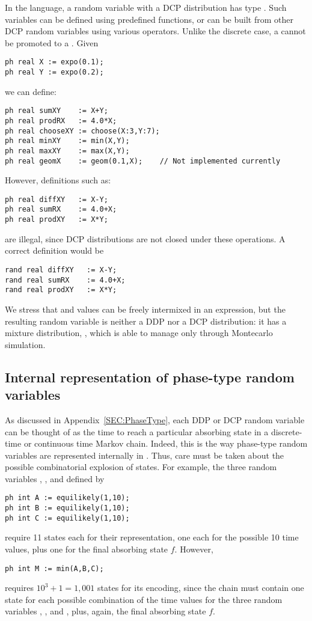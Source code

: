 In the {\smart} language, a random variable with a DCP distribution
has type .
Such variables can be defined using predefined functions, or can be built
from other DCP random variables using various operators.
Unlike the discrete case, a  cannot be promoted to a .
Given
\begin{lstlisting}
ph real X := expo(0.1);
ph real Y := expo(0.2);
\end{lstlisting} 
we can define:
\begin{lstlisting}
ph real sumXY    := X+Y;
ph real prodRX   := 4.0*X;
ph real chooseXY := choose(X:3,Y:7);
ph real minXY    := min(X,Y);
ph real maxXY    := max(X,Y);
ph real geomX    := geom(0.1,X);    // Not implemented currently
\end{lstlisting}
However, definitions such as:
\begin{lstlisting}
ph real diffXY   := X-Y;
ph real sumRX    := 4.0+X;
ph real prodXY   := X*Y;
\end{lstlisting}
are illegal, since DCP distributions are not closed under these
operations.  A correct definition would be
\begin{lstlisting}
rand real diffXY   := X-Y;
rand real sumRX    := 4.0+X;
rand real prodXY   := X*Y;
\end{lstlisting}

We stress that  and  values can be freely
intermixed in an expression, but the resulting random variable is
neither a DDP nor a DCP distribution: it has a mixture distribution,
, which {\smart} is able to manage only through
Montecarlo simulation.


\subsection{Internal representation of phase-type random variables}

As discussed in Appendix~\ref{SEC:PhaseType}, each DDP or DCP random
variable can be thought of as the time to reach a particular absorbing state
in a discrete-time or continuous time Markov chain.
Indeed, this is the way phase-type random variables are represented internally
in {\smart}.
Thus, care must be taken about the possible combinatorial explosion of
states.
For example, the three random variables , , and 
defined by
\begin{lstlisting}
ph int A := equilikely(1,10);
ph int B := equilikely(1,10); 
ph int C := equilikely(1,10); 
\end{lstlisting}
require 11 states each for their representation, one each for the
possible 10 time values, plus one for the final absorbing state $f$.
However,
\begin{lstlisting}
ph int M := min(A,B,C);
\end{lstlisting}
requires $10^3+1 = 1,001$ states for its encoding, since the chain must
contain one state for each possible combination of the time values for the
three random variables , , and , plus, again,
the final absorbing state $f$.

